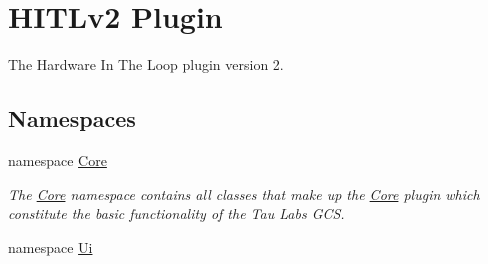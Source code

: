 \hypertarget{group___h_i_t_l_plugin}{\section{H\-I\-T\-Lv2 Plugin}
\label{group___h_i_t_l_plugin}
}


The Hardware In The Loop plugin version 2.  


\subsection*{Namespaces}
\begin{DoxyCompactItemize}
\item 
namespace \hyperlink{namespace_core}{Core}
\begin{DoxyCompactList}\small\item\em The \hyperlink{namespace_core}{Core} namespace contains all classes that make up the \hyperlink{namespace_core}{Core} plugin which constitute the basic functionality of the Tau Labs G\-C\-S. \end{DoxyCompactList}\item 
namespace \hyperlink{namespace_ui}{Ui}
\end{DoxyCompactItemize}
